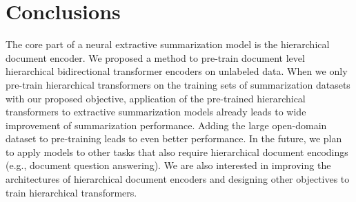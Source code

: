 \documentclass[11pt,a4paper]{article}
\begin{document}
\section{Conclusions}
The core part of a neural extractive summarization model is the hierarchical document encoder. 
We proposed a method to pre-train document level hierarchical bidirectional transformer encoders on unlabeled data. When we only pre-train hierarchical transformers on the training sets of summarization datasets with our proposed objective, application of the pre-trained hierarchical transformers to extractive summarization models already leads to wide improvement of summarization performance. Adding the large open-domain dataset to pre-training leads to even better performance. In the future, we plan to apply models to other tasks that also require hierarchical document encodings (e.g., document question answering). We are also interested in improving the architectures of hierarchical document encoders and designing other objectives to train hierarchical transformers.



\end{document}

